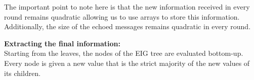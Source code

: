 The important point to note here is that the new information received in every round remains quadratic allowing us to use arrays to store this information. Additionally, the size of the echoed messages remains quadratic in every round. 

\textbf{Extracting the final information:}\\
Starting from the leaves, the nodes of the EIG tree are evaluated bottom-up. Every node is given a new value that is the strict majority of the new values of its children.
